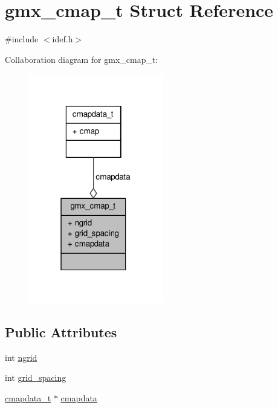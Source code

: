\hypertarget{structgmx__cmap__t}{\section{gmx\-\_\-cmap\-\_\-t \-Struct \-Reference}
\label{structgmx__cmap__t}
}


{\ttfamily \#include $<$idef.\-h$>$}



\-Collaboration diagram for gmx\-\_\-cmap\-\_\-t\-:
\nopagebreak
\begin{figure}[H]
\begin{center}
\leavevmode
\includegraphics[width=166pt]{structgmx__cmap__t__coll__graph}
\end{center}
\end{figure}
\subsection*{\-Public \-Attributes}
\begin{DoxyCompactItemize}
\item 
int \hyperlink{structgmx__cmap__t_a1a1b7ca5da1c10b1b32ce4d347e28bcb}{ngrid}
\item 
int \hyperlink{structgmx__cmap__t_a33fff24fdd8af811e3cab88f85a684d4}{grid\-\_\-spacing}
\item 
\hyperlink{structcmapdata__t}{cmapdata\-\_\-t} $\ast$ \hyperlink{structgmx__cmap__t_aed2a574424956e2fd4160984fed57df8}{cmapdata}
\end{DoxyCompactItemize}


